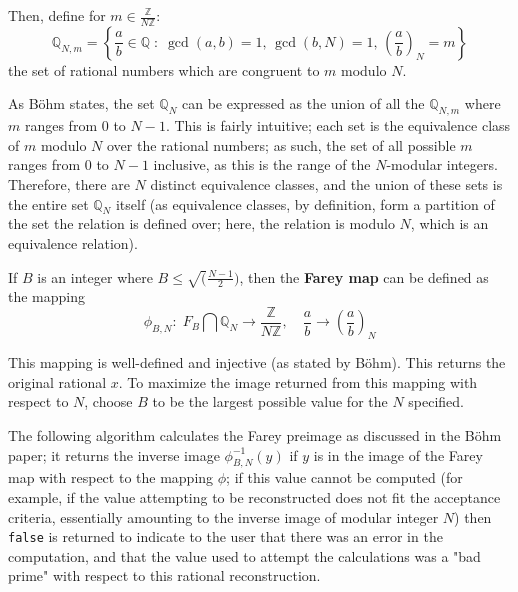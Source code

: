 \documentclass[letterpaper,12pt,titlepage,oneside,final]{book}
\begin{document}
Then, define for ${m \in \frac{\mathbb{Z}}{N\mathbb{Z}}}$:
\begin{equation*}
  \mathbb{Q}_{N, m} = \left\{\frac{a}{b} \in \mathbb{Q}\; : \; \gcd(a, b) = 1,\, \gcd(b, N) = 1,\, \left(\frac{a}{b}\right)_N = m\right\}
\end{equation*}
the set of rational numbers which are congruent to ${m}$ modulo ${N}$.  

As B\"ohm states, the set ${\mathbb{Q}_N}$ can be expressed as the union of all the ${\mathbb{Q}_{N, m}}$ where ${m}$ ranges from 0 to ${N - 1}$.  This is fairly intuitive; each set is the equivalence class of ${m}$ modulo ${N}$ over the rational numbers; as such, the set of all possible ${m}$ ranges from 0 to ${N - 1}$ inclusive, as this is the range of the ${N}$-modular integers.  Therefore, there are ${N}$ distinct equivalence classes, and the union of these sets is the entire set ${\mathbb{Q}_N}$ itself (as equivalence classes, by definition, form a partition of the set the relation is defined over; here, the relation is modulo ${N}$, which is an equivalence relation).  

If ${B}$ is an integer where ${B \leq \sqrt(\frac{N - 1}{2})}$, then the \textbf{Farey map} can be defined as the mapping
\begin{equation*}
  \phi_{B, N}:\; F_B \bigcap \mathbb{Q}_N \rightarrow \frac{\mathbb{Z}}{N\mathbb{Z}},\quad \frac{a}{b} \rightarrow \left(\frac{a}{b}\right)_N
\end{equation*}

This mapping is well-defined and injective (as stated by B\"ohm).  This returns the original rational ${x}$.  To maximize the image returned from this mapping with respect to ${N}$, choose ${B}$ to be the largest possible value for the ${N}$ specified.

The following algorithm calculates the Farey preimage as discussed in the B\"ohm paper; it returns the inverse image ${\phi_{B, N}^{-1}(y)}$ if ${y}$ is in the image of the Farey map with respect to the mapping ${\phi}$; if this value cannot be computed (for example, if the value attempting to be reconstructed does not fit the acceptance criteria, essentially amounting to the inverse image of modular integer ${N}$) then \texttt{false} is returned to indicate to the user that there was an error in the computation, and that the value used to attempt the calculations was a "bad prime" with respect to this rational reconstruction.
\end{document}
